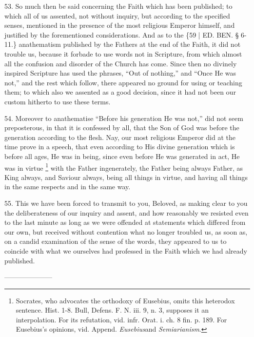 53. So much then be said
concerning the Faith which has been published; to which all of us
assented, not without inquiry, but according to the specified senses,
mentioned in the presence of the most religious Emperor himself, and
justified by the forementioned considerations. And as to the \{59 | ED. BEN.
§ 6-11.\} anathematism published by the Fathers at the end of the
Faith, it did not trouble us, because it forbade to use words not in
Scripture, from which almost all the confusion and disorder of the
Church has come. Since then no divinely inspired Scripture has used
the phrases, ``Out of nothing,'' and ``Once He was not,'' and the rest
which follow, there appeared no ground for using or teaching them; to
which also we assented as a good decision, since it had not been our
custom hitherto to use these terms.

54. Moreover to anathematise ``Before
his generation He was not,'' did not seem preposterous, in that it is
confessed by all, that the Son of God was before the generation
according to the flesh. Nay, our most religious Emperor did at the
time prove in a speech, that even according to His divine generation
which is before all ages, He was in being, since even before He was
generated in act, He was in virtue \footnote{Socrates, who advocates the orthodoxy of Eusebius, omits this
heterodox sentence. Hist. 1-8. Bull, Defens. F. N. iii. 9, n. 3,
supposes it an interpolation. For its refutation, vid. infr. Orat. i.
ch. 8 fin. p. 189. For Eusebius's opinions, vid. Append. \emph{Eusebius}and
\emph{Semiarianism}.} with the Father ingenerately, the Father being always Father,
as King always, and Saviour always, being all things in virtue, and
having all things in the same respects and in the same way.

55. This we have been forced
to transmit to you, Beloved, as making clear to you the deliberateness
of our inquiry and assent, and how reasonably we resisted even to the
last minute as long as we were offended at statements which differed
from our own, but received without contention what no longer troubled
us, as soon as, on a candid examination of the sense of the words,
they appeared to us to coincide with what we ourselves had professed
in the Faith which we had already published.


———————


